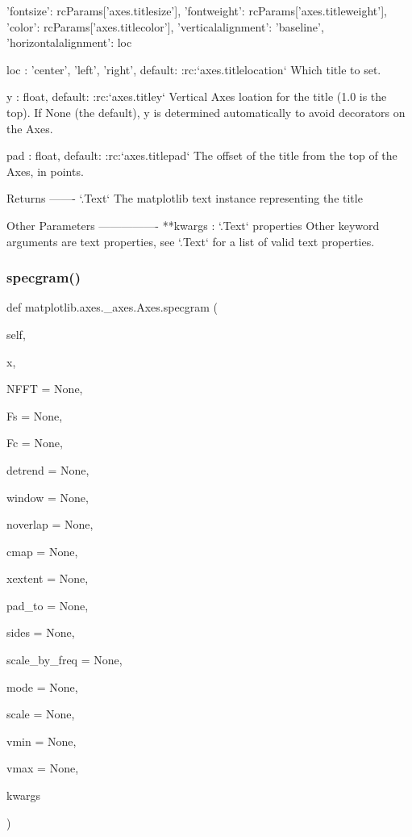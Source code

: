 \begin{DoxyVerb}
\begin{DoxyVerb}
       {'fontsize': rcParams['axes.titlesize'],
'fontweight': rcParams['axes.titleweight'],
'color': rcParams['axes.titlecolor'],
'verticalalignment': 'baseline',
'horizontalalignment': loc}

loc : {'center', 'left', 'right'}, default: :rc:`axes.titlelocation`
    Which title to set.

y : float, default: :rc:`axes.titley`
    Vertical Axes loation for the title (1.0 is the top).  If
    None (the default), y is determined automatically to avoid
    decorators on the Axes.

pad : float, default: :rc:`axes.titlepad`
    The offset of the title from the top of the Axes, in points.

Returns
-------
`.Text`
    The matplotlib text instance representing the title

Other Parameters
----------------
**kwargs : `.Text` properties
    Other keyword arguments are text properties, see `.Text` for a list
    of valid text properties.
\end{DoxyVerb}
 \mbox{\label{classmatplotlib_1_1axes_1_1__axes_1_1Axes_aea2e06c322ba7ec8e5eb38a804da418b}} 
\subsubsection{\texorpdfstring{specgram()}{specgram()}}
{\footnotesize\ttfamily def matplotlib.\+axes.\+\_\+axes.\+Axes.\+specgram (\begin{DoxyParamCaption}\item[{}]{self,  }\item[{}]{x,  }\item[{}]{N\+F\+FT = {\ttfamily None},  }\item[{}]{Fs = {\ttfamily None},  }\item[{}]{Fc = {\ttfamily None},  }\item[{}]{detrend = {\ttfamily None},  }\item[{}]{window = {\ttfamily None},  }\item[{}]{noverlap = {\ttfamily None},  }\item[{}]{cmap = {\ttfamily None},  }\item[{}]{xextent = {\ttfamily None},  }\item[{}]{pad\+\_\+to = {\ttfamily None},  }\item[{}]{sides = {\ttfamily None},  }\item[{}]{scale\+\_\+by\+\_\+freq = {\ttfamily None},  }\item[{}]{mode = {\ttfamily None},  }\item[{}]{scale = {\ttfamily None},  }\item[{}]{vmin = {\ttfamily None},  }\item[{}]{vmax = {\ttfamily None},  }\item[{}]{kwargs }\end{DoxyParamCaption})}


\end{DoxyVerb}
